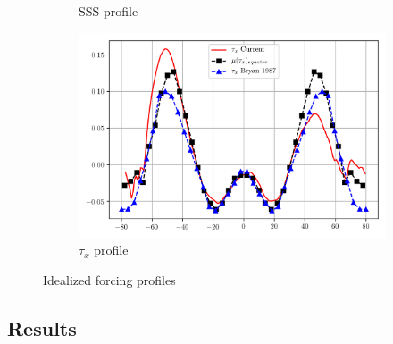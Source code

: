 \documentclass[a4paper]{article}
\begin{document}
\begin{figure}[H]
\begin{subfigure}{.5\textwidth}
	\caption{SSS profile}
	\label{fig:sss_profile}
\end{subfigure}
\begin{subfigure}{.5\textwidth}
	\includegraphics[width=\linewidth]{windstress_models.png}
	\caption{$\tau_x$ profile}
	\label{fig:tau_profile}
\end{subfigure}

\caption{Idealized forcing profiles}
\label{fig:idealized_forc}
\end{figure}

\begin{multicols}{2}







\section{Results}



\end{multicols}
\end{document}
